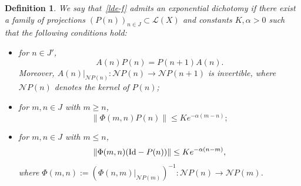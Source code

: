 \documentclass[11pt,reqno,a4paper]{amsart}
\theoremstyle{plain}
\numberwithin{equation}{section}
\newtheorem{definition}{Definition}
\theoremstyle{remark}
\def\Id{\text{\rm Id}}
\begin{document}
\begin{definition}
We say that~\eqref{lde-f} admits an \emph{exponential dichotomy} if there exist a family of projections $(P(n))_{n\in J}\subset \mathcal L(X)$ and constants $K, \alpha>0$ such that the following conditions hold:
\begin{itemize}
\item[(i)] for $n\in J'$,
\[
A(n)P(n)=P(n+1)A(n).
\]
Moreover, $A(n)\rvert_{\mathcal N P(n)}\colon \mathcal N P(n)\to \mathcal N P(n+1)$ is invertible, where $\mathcal N P(n)$ denotes the kernel of $P(n)$;
\item[(ii)]  for $m, n\in J$ with $m\ge n$,
\[
\| \Phi(m, n)P(n)\| \le Ke^{-\alpha (m-n)};
\]
\item[(iii)] for $m, n\in J$ with $m\le n$,
\[
\| \Phi(m, n)(\Id-P(n))\| \le Ke^{-\alpha (n-m)},
\]
where $\Phi(m, n):=\left (\Phi(n, m)\rvert_{\mathcal N P(m)}\right )^{-1}\colon \mathcal N P(n)\to \mathcal N P(m)$.
\end{itemize}
\end{definition}
\end{document}
